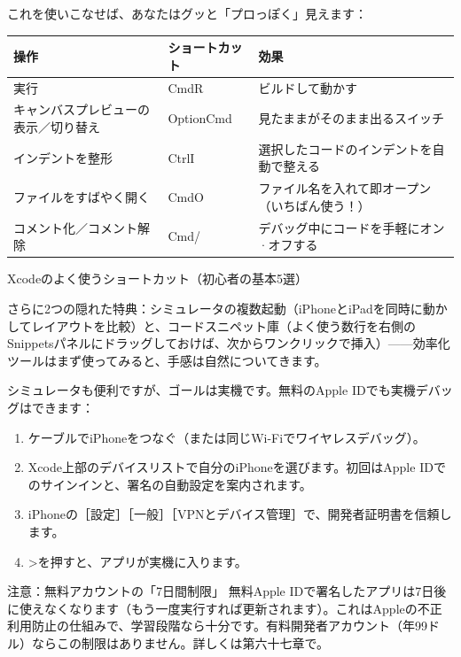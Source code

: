 

これを使いこなせば、あなたはグッと「プロっぽく」見えます：

\begin{center}
\begin{tabularx}{\linewidth}{|X|X|X|}
\hline
\textbf{操作} & \textbf{ショートカット} & \textbf{効果} \tabularnewline
\hline
実行 & CmdR & ビルドして動かす \tabularnewline
キャンバスプレビューの表示／切り替え & OptionCmd & 見たままがそのまま出るスイッチ \tabularnewline
インデントを整形 & CtrlI & 選択したコードのインデントを自動で整える \tabularnewline
ファイルをすばやく開く & CmdO & ファイル名を入れて即オープン（いちばん使う！） \tabularnewline
コメント化／コメント解除 & Cmd/ & デバッグ中にコードを手軽にオン·オフする \tabularnewline
\hline
\end{tabularx}
\end{center}

\begin{center}\small\color{gray}Xcodeのよく使うショートカット（初心者の基本5選）\end{center}

さらに2つの隠れた特典：シミュレータの複数起動（iPhoneとiPadを同時に動かしてレイアウトを比較）と、コードスニペット庫（よく使う数行を右側のSnippetsパネルにドラッグしておけば、次からワンクリックで挿入）——効率化ツールはまず使ってみると、手感は自然についてきます。


シミュレータも便利ですが、ゴールは実機です。無料のApple IDでも実機デバッグはできます：

\begin{enumerate}
  \item ケーブルでiPhoneをつなぐ（または同じWi-Fiでワイヤレスデバッグ）。
  \item Xcode上部のデバイスリストで自分のiPhoneを選びます。初回はApple IDでのサインインと、署名の自動設定を案内されます。
  \item iPhoneの［設定］［一般］［VPNとデバイス管理］で、開発者証明書を信頼します。
  \item >を押すと、アプリが実機に入ります。
\end{enumerate}

\begin{tcbwarn}{注意：無料アカウントの「7日間制限」}
無料Apple IDで署名したアプリは7日後に使えなくなります（もう一度実行すれば更新されます）。これはAppleの不正利用防止の仕組みで、学習段階なら十分です。有料開発者アカウント（年99ドル）ならこの制限はありません。詳しくは第六十七章で。

\end{tcbwarn}

